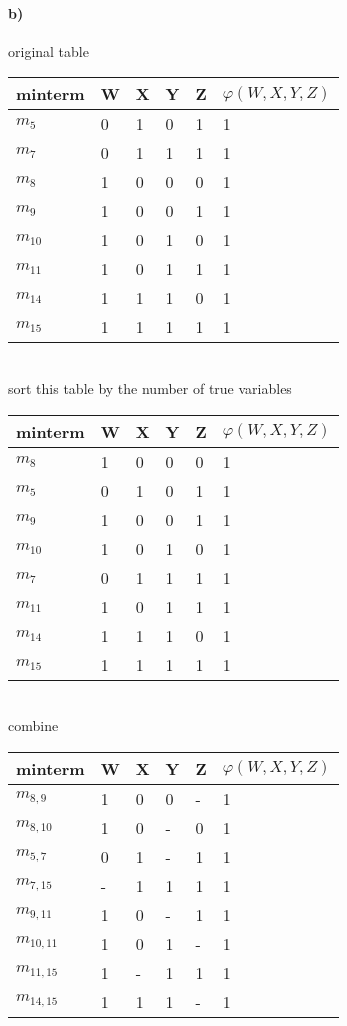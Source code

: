 \documentclass{article}
\begin{document}
\paragraph{b)}
original table \\
\begin{tabular}{ | p{2cm} | p{1cm} | p{1cm} | p{1cm} | p{1cm} | p{3cm} |}
    \hline
    minterm & W & X & Y & Z & $\varphi(W, X, Y, Z)$ \\
    \hline
    $m_5$ & 0 & 1 & 0 & 1 & 1 \\
    $m_7$ & 0 & 1 & 1 & 1 & 1 \\
    $m_8$ & 1 & 0 & 0 & 0 & 1 \\
    $m_9$ & 1 & 0 & 0 & 1 & 1 \\
    $m_{10}$ & 1 & 0 & 1 & 0 & 1 \\
    $m_{11}$ & 1 & 0 & 1 & 1 & 1 \\
    $m_{14}$ & 1 & 1 & 1 & 0 & 1 \\
    $m_{15}$ & 1 & 1 & 1 & 1 & 1 \\
    \hline
\end{tabular}
\\ sort this table by the number of true variables \\
\begin{tabular}{ | p{2cm} | p{1cm} | p{1cm} | p{1cm} | p{1cm} | p{3cm} |}
    \hline
    minterm & W & X & Y & Z & $\varphi(W, X, Y, Z)$ \\
    \hline
    $m_8$ & 1 & 0 & 0 & 0 & 1 \\
    \hline
    $m_5$ & 0 & 1 & 0 & 1 & 1 \\
    $m_9$ & 1 & 0 & 0 & 1 & 1 \\
    $m_{10}$ & 1 & 0 & 1 & 0 & 1 \\
    \hline
    $m_7$ & 0 & 1 & 1 & 1 & 1 \\
    $m_{11}$ & 1 & 0 & 1 & 1 & 1 \\
    $m_{14}$ & 1 & 1 & 1 & 0 & 1 \\
    \hline
    $m_{15}$ & 1 & 1 & 1 & 1 & 1 \\
    \hline
\end{tabular}
\\ combine \\
\begin{tabular}{ | p{2cm} | p{1cm} | p{1cm} | p{1cm} | p{1cm} | p{3cm} |}
    \hline
    minterm & W & X & Y & Z & $\varphi(W, X, Y, Z)$ \\
    \hline
    $m_{8,9}$ & 1 & 0 & 0 & - & 1 \\
    $m_{8,10}$ & 1 & 0 & - & 0 & 1 \\
    $m_{5,7}$ & 0 & 1 & - & 1 & 1 \\
    $m_{7, 15}$ & - & 1 & 1 & 1 & 1 \\
    $m_{9,11}$ & 1 & 0 & - & 1 & 1\\
    $m_{10,11}$ & 1 & 0 & 1 & - & 1\\
    $m_{11,15}$ & 1 & - & 1 & 1 & 1 \\
    $m_{14,15}$ & 1 & 1 & 1 & - & 1 \\
    \hline
\end{tabular}
\end{document}
